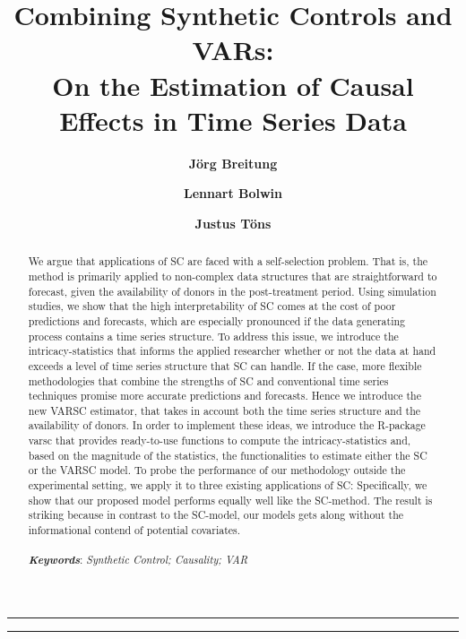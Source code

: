 \documentclass[11pt]{article}
\author[a]{\textbf{Jörg Breitung}}
\author[b]{\textbf{Lennart Bolwin}}
\author[b]{\textbf{Justus Töns}}
\affil[a]{University of Cologne, Chair of Statistics and Econometrics}
\affil[b]{University of Cologne, Chair of Statistics and Econometrics \newline
	Supervised by Prof. Dr. Jörg Breitung
}
\title{\textbf{\huge Combining Synthetic Controls and VARs:}\\
	On the Estimation of Causal Effects in Time Series Data}
\date{}
\begin{document}
	\onehalfspacing
	\pagestyle{headings}	
	\newpage
	\setcounter{page}{1}
	\renewcommand{\thepage}{\arabic{page}}
	
	
	
		
	\setlength{\parskip}{0.5em}
	
	\maketitle
	
	\noindent\rule{15cm}{0.5pt}
	\begin{abstract}
		We argue that applications of \ac{SC} are faced with a self-selection problem. That is, the method is primarily applied to non-complex data structures that are straightforward to forecast, given the availability of donors in the post-treatment period. Using simulation  studies, we show that the high interpretability of \ac{SC} comes at the cost of poor predictions and forecasts, which are especially pronounced if the data generating process contains a time series structure. To address this issue, we introduce the intricacy-statistics that informs the applied researcher whether or not the data at hand exceeds a level of time series structure that \ac{SC} can handle. If the case, more flexible methodologies that combine the strengths of \ac{SC} and conventional time series techniques promise more accurate predictions and forecasts. Hence we introduce the new \ac{VARSC} estimator, that takes in account both the time series structure and the availability of donors. In order to implement these ideas, we introduce the R-package varsc that provides ready-to-use functions to compute the intricacy-statistics and, based on the magnitude of the statistics, the functionalities to estimate either the \ac{SC} or the \ac{VARSC} model. To probe the performance of our methodology outside the experimental setting, we apply it to three existing applications of \ac{SC}: Specifically, we show that our proposed model performs equally well like the SC-method. The result is striking because in contrast to the \ac{SC}-model, our models gets along without the informational contend of potential covariates. \\ \\
		
		\textbf{\textit{Keywords}}: \textit{Synthetic Control; Causality; VAR}
	\end{abstract}
	\noindent\rule{15cm}{0.4pt}
	
	
	\newpage
	\doublespacing
	
	\newpage
	\tableofcontents
	\newpage
	\listoffigures
	\newpage
	
	\newpage	
	
	\newpage
	
	\newpage	
	
	\newpage
	
	\newpage
	
	
	\newpage
	 
	
	
	\newpage
	
	
\end{document}
